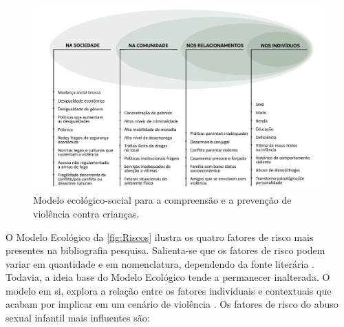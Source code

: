 




\begin{figure}[htb]

  \caption{\label{fig:Riscos}Modelo ecológico-social para a compreensão e a prevenção de violência contra crianças.}
  \hspace{-2.2cm}
    \includegraphics[width=1.28\linewidth]{./Figuras/Ecologico.pdf}

\end{figure}

O Modelo Ecológico da \autoref{fig:Riscos} ilustra os quatro fatores de risco mais presentes na bibliografia pesquisa. Salienta-se que os fatores de risco podem variar em quantidade e em nomenclatura, dependendo da fonte literária \cite{centers2004sexual, sexual2017department, blasco2018abuso, topromising}. Todavia, a ideia base do Modelo Ecológico tende a permanecer inalterada. O modelo em si, explora a relação entre os fatores individuais e contextuais que acabam por implicar em um cenário de violência \cite{dahlberg2006violencia}. Os fatores de risco do abuso sexual infantil mais influentes são:

